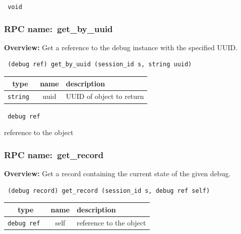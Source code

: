 \vspace{0.3cm}

{\tt 
void
}



\vspace{0.3cm}
\vspace{0.3cm}
\vspace{0.3cm}
\subsubsection{RPC name:~get\_by\_uuid}

{\bf Overview:} 
Get a reference to the debug instance with the specified UUID.

\begin{verbatim} (debug ref) get_by_uuid (session_id s, string uuid)\end{verbatim}



 
\vspace{0.3cm}
\begin{tabular}{|c|c|p{7cm}|}
 \hline
{\bf type} & {\bf name} & {\bf description} \\ \hline
{\tt string } & uuid & UUID of object to return \\ \hline 

\end{tabular}

\vspace{0.3cm}

{\tt 
debug ref
}


reference to the object
\vspace{0.3cm}
\vspace{0.3cm}
\vspace{0.3cm}
\subsubsection{RPC name:~get\_record}

{\bf Overview:} 
Get a record containing the current state of the given debug.

\begin{verbatim} (debug record) get_record (session_id s, debug ref self)\end{verbatim}



 
\vspace{0.3cm}
\begin{tabular}{|c|c|p{7cm}|}
 \hline
{\bf type} & {\bf name} & {\bf description} \\ \hline
{\tt debug ref } & self & reference to the object \\ \hline 

\end{tabular}


